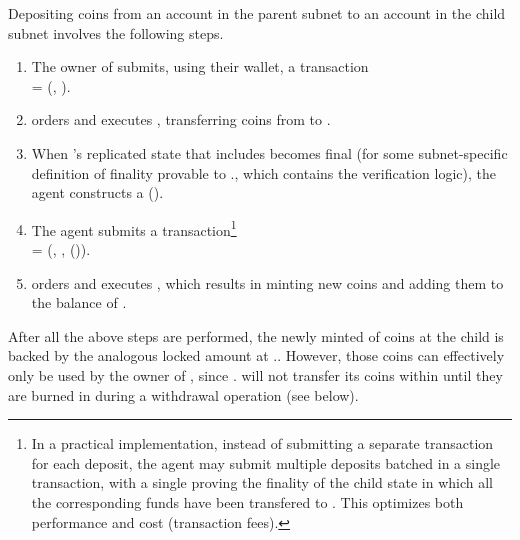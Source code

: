 Depositing  coins from an account  in the parent subnet  to an account  in the child subnet 
involves the following steps.

\begin{enumerate}

    \item The owner of  submits, using their wallet, a transaction\\
     = (, ).
    
    \item {} orders and executes , transferring  coins from  to .
    
    \item \label{item:deposit-step-create-pof}
    When 's replicated state that includes  becomes final (for some subnet-specific definition of finality provable to .\gw, which contains the \pof verification logic),
    the \ipc agent constructs a {\pof}().
    
    \item \label{item:deposit-step-submit-pof}
    The \ipc agent submits a transaction\footnote{In a practical implementation, instead of submitting a separate transaction for each deposit,
    the \ipc agent may submit multiple deposits batched in a single transaction,
    with a single \pof proving the finality of the child state in which all the corresponding funds have been transfered to .
    This optimizes both performance and cost (transaction fees).
    }\\
     = (, , {\pof}()).
    
    \item {} orders and executes , which results in minting  new coins and adding them to the balance of .
    
\end{enumerate}

After all the above steps are performed, the newly minted  of coins at the child is backed by the analogous locked amount at ..
However, those coins can effectively only be used by the owner of ,
since . will not transfer its coins within  until they are burned in  during a withdrawal operation (see below).

